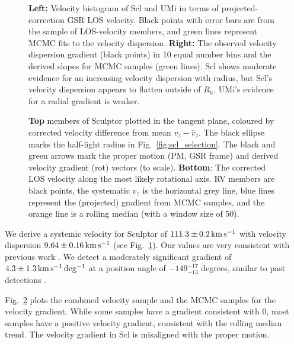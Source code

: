 \begin{figure}
\centering
{}
\caption[Velocity dispersion fits]{\textbf{Left:} Velocity histogram of
Scl and UMi in terms of projected-correction GSR LOS velocity. Black
points with error bars are from the sample of LOS-velocity members, and
green lines represent MCMC fits to the velocity dispersion.
\textbf{Right:} The observed velocity dispersion gradient (black points)
in 10 equal number bins and the derived slopes for MCMC samples (green
lines). Scl shows moderate evidence for an increasing velocity
dispersion with radius, but Scl's velocity dispersion appears to flatten
outside of \(R_h\). UMi's evidence for a radial gradient is
weaker.}\label{fig:rv_hists}
\end{figure}



\begin{figure}
\centering
{}
\caption[A possible velocity gradient in Sculptor]{\textbf{Top} members
of Sculptor plotted in the tangent plane, coloured by corrected velocity
difference from mean \(v_z - \bar v_z\). The black ellipse marks the
half-light radius in Fig.~\ref{fig:scl_selection}. The black and green
arrows mark the proper motion (PM, GSR frame) and derived velocity
gradient (rot) vectors (to scale). \textbf{Bottom}: The corrected LOS
velocity along the most likely rotational axis. RV members are black
points, the systematic \(v_z\) is the horizontal grey line, blue lines
represent the (projected) gradient from MCMC samples, and the orange
line is a rolling median (with a window size of
50).}\label{fig:scl_velocity_gradient_scatter}
\end{figure}

We derive a systemic velocity for Sculptor of \(111.3\pm0.2\,{\rm km\,s^{-1}}\) with
velocity dispersion \(9.64\pm0.16\,{\rm km\,s^{-1}}\) (see Fig.~\ref{fig:rv_hists}).
Our values are very consistent with previous work
\citep[e.g.,][]{walker+2009, arroyo-polonio+2024, battaglia+2008}. We
detect a moderately significant gradient of \(4.3\pm1.3\,{\rm km\,s^{-1}\,deg^{-1}}\) at a
position angle of \(-149_{-13}^{+17}\) degrees, similar to past
detections
\citetext{\citealp[e.g.,][]{arroyo-polonio+2024}; \citealp{battaglia+2008}; \citealp[but
see also][]{strigari2010}; \citealp{martinez-garcia+2023}}.

Fig.~\ref{fig:scl_velocity_gradient_scatter} plots the combined velocity
sample and the MCMC samples for the velocity gradient. While some
samples have a gradient consistent with 0, most samples have a positive
velocity gradient, consistent with the rolling median trend. The
velocity gradient in Scl is misaligned with the proper motion.

